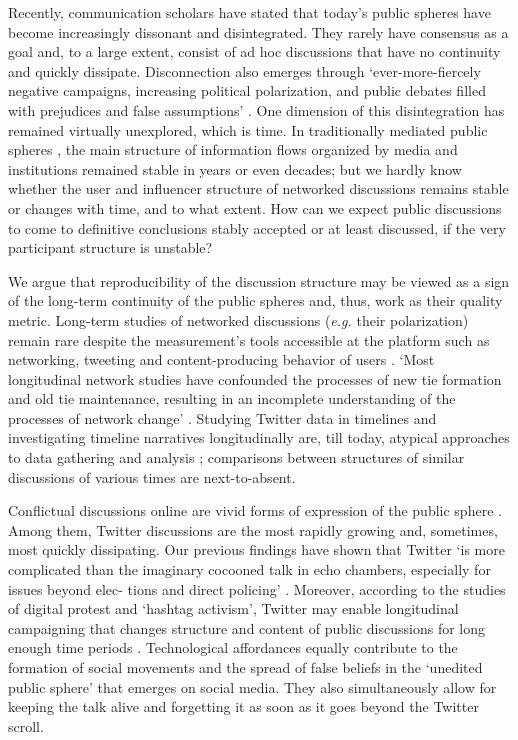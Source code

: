 Recently, communication scholars have stated that today’s public spheres \cite{Habermas} have become increasingly dissonant \cite{Pfetsch} and disintegrated. They rarely have consensus as a goal and, to a large extent, consist of ad hoc discussions \cite{BrunsBurgess} that have no continuity and quickly dissipate. Disconnection also emerges through ‘ever-more-fiercely negative campaigns, increasing political polarization, and public debates filled with prejudices and false assumptions’ \cite[p.~59]{Pfetsch}. One dimension of this disintegration has remained virtually unexplored, which is time. In traditionally mediated public spheres \cite{Calhoun}, the main structure of information flows organized by media and institutions remained stable in years or even decades; but we hardly know whether the user and influencer structure of networked discussions remains stable or changes with time, and to what extent. How can we expect public discussions to come to definitive conclusions stably accepted or at least discussed, if the very participant structure is unstable?

We argue that reproducibility of the discussion structure may be viewed as a sign of the long-term continuity of the public spheres and, thus, work as their quality metric. Long-term studies of networked discussions (\textit{e.g.} their polarization) remain rare despite the measurement’s tools accessible at the platform such as networking, tweeting and content-producing behavior of users \cite{GarimellaWeber}. ‘Most longitudinal network studies have confounded the processes of new tie formation and old tie maintenance, resulting in an incomplete understanding of the processes of network change’ \cite{Fu}. Studying Twitter data in timelines and investigating timeline narratives longitudinally are, till today, atypical approaches to data gathering and analysis \cite{BrookerVinesBarnett}; comparisons between structures of similar discussions of various times are next-to-absent.

Conflictual discussions online are vivid forms of expression of the public sphere \cite{BodrunovaBlekanovSmoliarova}. Among them, Twitter discussions are the most rapidly growing and, sometimes, most quickly dissipating. Our previous findings have shown that Twitter ‘is more complicated than the imaginary cocooned talk in echo chambers, especially for issues beyond elec- tions and direct policing’ \cite[p.~130]{BodrunovaBlekanovSmoliarova}. Moreover, according to the studies of digital protest and ‘hashtag activism’, Twitter may enable longitudinal campaigning that changes structure and content of public discussions for long enough time periods \cite{BonillaRosa}. Technological affordances equally contribute to the formation of social movements and the spread of false beliefs in the ‘unedited public sphere’ \cite{BimberDeZuniga} that emerges on social media. They also simultaneously allow for keeping the talk alive and forgetting it as soon as it goes beyond the Twitter scroll.


